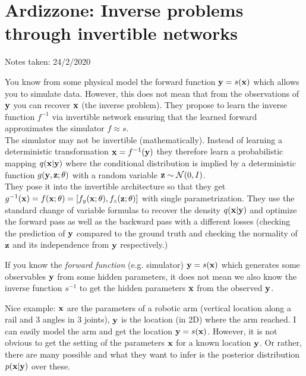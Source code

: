 \clearpage 

\section{Ardizzone: Inverse problems through invertible networks}\label{sec:inverseProblem}

\begin{notebox}

\hfill Notes taken: 24/2/2020 
\end{notebox}

\begin{notebox}
\tldr You know from some physical model the forward function $\mathbf{y} = s(\mathbf{x})$ which allows you to simulate data. However, this does not mean that from the observations of $\mathbf{y}$ you can recover $\mathbf{x}$ (the inverse problem). They propose to learn the inverse function $f^{-1}$ via invertible network ensuring that the learned forward approximates the simulator $f \approx s$. \\

The simulator may not be invertible (mathematically). Instead of learning a deterministic transformation $\mathbf{x} = f^{-1}(\mathbf{y})$ they therefore learn a probabilistic mapping $q(\mathbf{x}| \mathbf{y})$ where the conditional distribution is implied by a deterministic function $g(\mathbf{y}, \mathbf{z}; \theta)$ with a random variable $\mathbf{z} \sim \mathcal{N}(0, I)$. \\

They pose it into the invertible architecture so that they get $g^{-1}(\mathbf{x}) = f(\mathbf{x}; \theta) = [f_y(\mathbf{x}; \theta), f_z(\mathbf{z}; \theta)]$ with single parametrization. They use the standard change of variable formulas to recover the density $q(\mathbf{x}| \mathbf{y})$ and optimize the forward pass as well as the backward pass with a different losses (checking the prediction of $\mathbf{y}$ compared to the ground truth and checking the normality of $\mathbf{z}$ and its independence from $\mathbf{y}$ respectively.)
\end{notebox}

If you know the \emph{forward function} (e.g. simulator) $\mathbf{y} = s(\mathbf{x})$ which generates some observables $\mathbf{y}$ from some hidden parameters, it does not mean we also know the inverse function $s^{-1}$ to get the hidden parameters $\mathbf{x}$ from the observed $\mathbf{y}$.

Nice example: $\mathbf{x}$ are the parameters of a robotic arm (vertical location along a rail and 3 angles in 3 joints), $\mathbf{y}$ is the location (in 2D) where the arm reached. I can easily model the arm and get the location $\mathbf{y} = s(\mathbf{x})$. However, it is not obvious to get the setting of the parameters $\mathbf{x}$ for a known location $\mathbf{y}$. Or rather, there are many possible and what they want to infer is the posterior distribution $p(\mathbf{x} | \mathbf{y})$ over these. 

